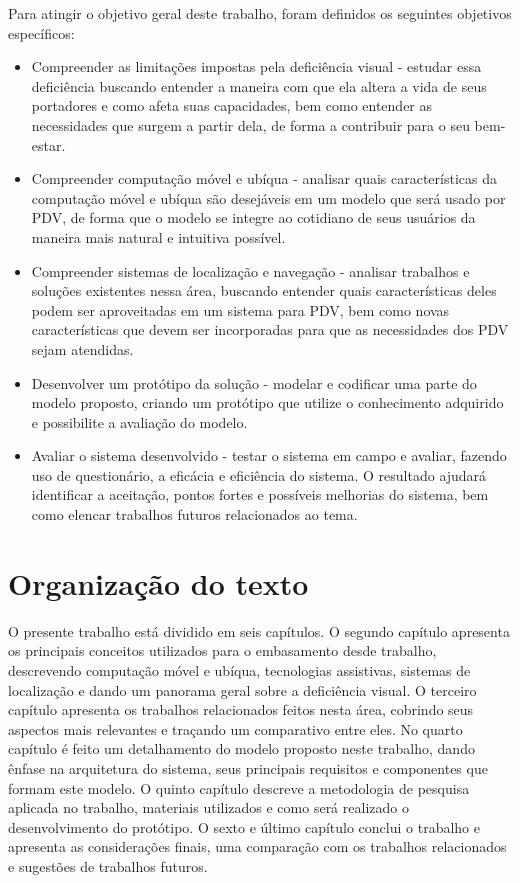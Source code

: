 \documentclass[english,brazilian]{UNISINOSmonografia}
\begin{document}
		Para atingir o objetivo geral deste trabalho, foram definidos os seguintes objetivos específicos:

		\begin{itemize}
			\item Compreender as limitações impostas pela deficiência visual - estudar essa deficiência buscando entender a maneira com que ela altera a vida de seus portadores e como afeta suas capacidades, bem como entender as necessidades que surgem a partir dela, de forma a contribuir para o seu bem-estar.

			\item Compreender computação móvel e ubíqua - analisar quais características da computação móvel e ubíqua são desejáveis em um modelo que será usado por PDV, de forma que o modelo se integre ao cotidiano de seus usuários da maneira mais natural e intuitiva possível.

			\item Compreender sistemas de localização e navegação - analisar trabalhos e soluções existentes nessa área, buscando entender quais características deles podem ser aproveitadas em um sistema para PDV, bem como novas características que devem ser incorporadas para que as necessidades dos PDV sejam atendidas.

			\item Desenvolver um protótipo da solução - modelar e codificar uma parte do modelo proposto, criando um protótipo que utilize o conhecimento adquirido e possibilite a avaliação do modelo.

			\item Avaliar o sistema desenvolvido - testar o sistema em campo e avaliar, fazendo uso de questionário, a eficácia e eficiência do sistema. O resultado ajudará identificar a aceitação, pontos fortes e possíveis melhorias do sistema, bem como elencar trabalhos futuros relacionados ao tema.
		\end{itemize}

	\section{Organização do texto}
O presente trabalho está dividido em seis capítulos. 
O segundo capítulo apresenta os principais conceitos utilizados para o embasamento desde trabalho, descrevendo computação móvel e ubíqua, tecnologias assistivas, sistemas de localização e dando um panorama geral sobre a deficiência visual.
O terceiro capítulo apresenta os trabalhos relacionados feitos nesta área, cobrindo seus aspectos mais relevantes e traçando um comparativo entre eles.
No quarto capítulo é feito um detalhamento do modelo proposto neste trabalho, dando ênfase na arquitetura do sistema, seus principais requisitos e componentes que formam este modelo.
O quinto capítulo descreve a metodologia de pesquisa aplicada no trabalho, materiais utilizados e como será realizado o desenvolvimento do protótipo.
O sexto e último capítulo conclui o trabalho e apresenta as considerações finais, uma comparação com os trabalhos relacionados e sugestões de trabalhos futuros.
\end{document}
